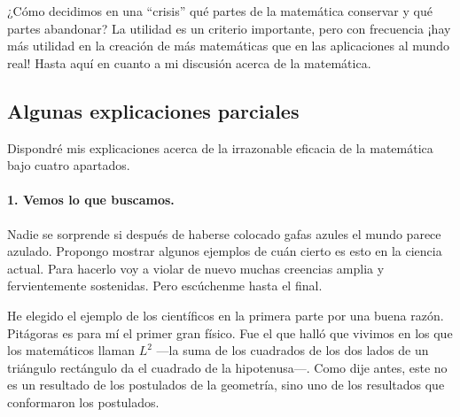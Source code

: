\documentclass[a4paper, 12pt]{article}
\begin{document}
 

¿Cómo decidimos en una ``crisis'' qué partes de la matemática conservar y qué partes abandonar? La utilidad es un criterio importante, pero con frecuencia ¡hay más utilidad en la creación de más matemáticas que en las aplicaciones al mundo real! Hasta aquí en cuanto a mi  discusión acerca de la matemática.

 

\subsection*{Algunas explicaciones parciales}

 Dispondré mis explicaciones acerca de la irrazonable eficacia de la matemática bajo cuatro apartados.

 

\paragraph*{1. Vemos lo que buscamos.}


 Nadie se sorprende si después de haberse colocado gafas azules el mundo parece azulado. Propongo mostrar algunos ejemplos de cuán cierto es esto en la ciencia actual. Para hacerlo voy a violar de nuevo muchas creencias amplia y fervientemente sostenidas. Pero escúchenme hasta el final.

 

He elegido el ejemplo de los científicos en la primera parte por una buena razón. Pitágoras es para mí el primer gran físico. Fue el que halló que vivimos en los que los matemáticos llaman $L^2$ ---la suma de los cuadrados de los dos lados de un triángulo rectángulo da el cuadrado de la hipote\-nusa\mbox{---.} Como dije antes, este no es un resultado de los postulados de la geometría, sino uno de los resultados que conformaron los postulados.

 
\end{document}

